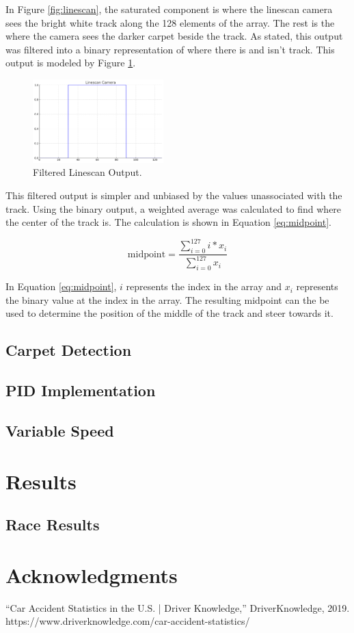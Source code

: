 \documentclass[conference]{IEEEtran}
\begin{document}
In Figure \ref{fig:linescan}, the saturated component is where the linescan camera sees the bright white track along the 128 elements of the array. The rest is the where the camera sees the darker carpet beside the track. As stated, this output was filtered into a binary representation of where there is and isn't track. This output is modeled by Figure \ref{fig:linescanFiltered}.

\begin{figure}[htbp]
	\centerline{\includegraphics[width=0.45\textwidth]{images/linescanFiltered.png}}
	\caption{Filtered Linescan Output.}
	\label{fig:linescanFiltered}
\end{figure}

This filtered output is simpler and unbiased by the values unassociated with the track. Using the binary output, a weighted average was calculated to find where the center of the track is. The calculation is shown in Equation \ref{eq:midpoint}.

\begin{equation}
	\text{midpoint} = \frac{\sum_{i=0}^{127} i*x_i}{\sum_{i=0}^{127} x_i}\label{eq:midpoint}
\end{equation}

In Equation \ref{eq:midpoint}, $i$ represents the index in the array and $x_i$ represents the binary value at the index in the array. The resulting midpoint can the be used to determine the position of the middle of the track and steer towards it.

\subsection{Carpet Detection}

\subsection{PID Implementation}

\subsection{Variable Speed}

\section{Results}

\subsection{Race Results}


\section*{Acknowledgments}

\begin{thebibliography}{00}
 “Car Accident Statistics in the U.S. | Driver Knowledge,” DriverKnowledge, 2019. https://www.driverknowledge.com/car-accident-statistics/
\end{thebibliography}
\end{document}

